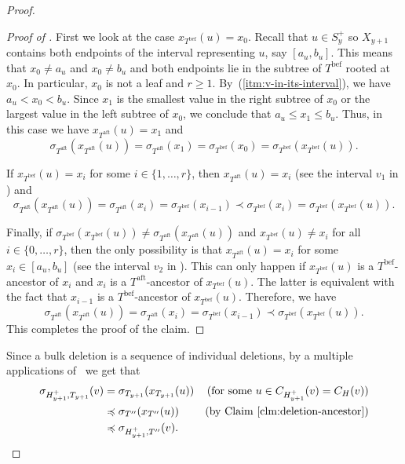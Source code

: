 \documentclass[kpfonts]{patmorin}
\let\leq\leqslant
\let\geq\geqslant
\let\preceq\preccurlyeq
\newcommand{\itemref}[1]{(\ref{#1})}
\begin{document}
\begin{proof}
\begin{proof}[Proof of ]
    First we look at the case $x_{T^{\text{bef}}}(u)=x_0$. 
    Recall that $u\in S^+_y$ so $X_{y+1}$ contains both endpoints of the interval representing $u$, say $[a_u,b_u]$. 
    This means that $x_0\neq a_u$ and $x_0\neq b_u$ and both endpoints lie in the subtree of $T^{\text{bef}}$ rooted at $x_0$. 
    In particular, $x_0$ is not a leaf and $r\geq 1$. 
    By~\itemref{itm:v-in-its-interval}, we have $a_u < x_0 < b_u$. 
    Since $x_1$ is the smallest value in the right subtree of $x_0$ or the largest value in the left subtree of $x_0$, we conclude that 
    $a_u\leq x_1\leq b_u$. 
    Thus, in this case we have $x_{T^{\text{aft}}}(u)=x_1$ and
    \[
    \sigma_{T^{\text{aft}}}(x_{T^{\text{aft}}}(u)) = \sigma_{T^{\text{aft}}}(x_1) = \sigma_{T^{\text{bef}}}(x_0) = \sigma_{T^{\text{bef}}}(x_{T^{\text{bef}}}(u)).
    \]

    If $x_{T^{\text{bef}}}(u)=x_i$ for some $i\in\{1,\ldots,r\}$, 
    then $x_{T^{\text{aft}}}(u)=x_i$ (see the interval $v_1$ in ) and 
    \[
    \sigma_{T^{\text{aft}}}(x_{T^{\text{aft}}}(u))= \sigma_{T^{\text{aft}}}(x_i) = \sigma_{T^{\text{bef}}}(x_{i-1}) \prec \sigma_{T^{\text{bef}}}(x_{i}) = \sigma_{T^{\text{bef}}}(x_{T^{\text{bef}}}(u)).\]

    Finally, if $\sigma_{T^{\text{bef}}}(x_{T^{\text{bef}}}(u))\neq \sigma_{T^{\text{aft}}}(x_{T^{\text{aft}}}(u))$ and
    $x_{T^{\text{bef}}}(u)\neq x_i$ for all $i\in\{0,\ldots,r\}$, 
    then the only possibility is that $x_{T^{\text{aft}}}(u)=x_i$ for some $x_i\in [a_u,b_u]$ (see the interval $v_2$ in ). 
    This can only happen if $x_{T^{\text{bef}}}(u)$ is a $T^{\text{bef}}$-ancestor of $x_i$ and $x_i$ is a $T^{\text{aft}}$-ancestor of $x_{T^{\text{bef}}}(u)$. 
    The latter is equivalent with the fact that $x_{i-1}$ is a $T^{\text{bef}}$-ancestor of $x_{T^{\text{bef}}}(u)$.
    Therefore, we have
    \[
    \sigma_{T^{\text{aft}}}(x_{T^{\text{aft}}}(u)) = \sigma_{T^{\text{aft}}}(x_i) = 
    \sigma_{T^{\text{bef}}}(x_{i-1}) \prec \sigma_{T^{\text{bef}}}(x_{T^{\text{bef}}}(u)).
    \]
    This completes the proof of the claim.
  \end{proof}

Since a bulk deletion is a sequence of individual deletions, by a multiple applications of~ we get that 
  \begin{align*}
    \sigma_{H^+_{y+1},T_{y+1}}(v)
      & = \sigma_{T_{y+1}}(x_{T_{y+1}}(u)) & \text{(for some $u\in C_{H^+_{y+1}}(v)=C_H(v)$)} \\
      & \preceq \sigma_{T''}(x_{T''}(u)) & \text{(by \clmref{deletion-ancestor})} \\
      & \preceq \sigma_{H^+_{y+1},T''}(v). %
  \end{align*}


\end{proof}
\end{document}
